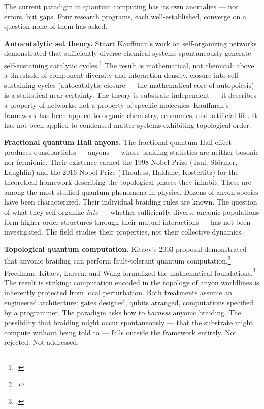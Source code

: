 The current paradigm in quantum computing has its own anomalies --- not errors, but gaps. Four research programs, each well-established, converge on a question none of them has asked.

\textbf{Autocatalytic set theory.} Stuart Kauffman's work on self-organizing networks demonstrated that sufficiently diverse chemical systems spontaneously generate self-sustaining catalytic cycles.\footcite{kauffman1993} The result is mathematical, not chemical: above a threshold of component diversity and interaction density, closure into self-sustaining cycles (autocatalytic closure --- the mathematical core of autopoiesis) is a statistical near-certainty. The theory is substrate-independent --- it describes a property of networks, not a property of specific molecules. Kauffman's framework has been applied to organic chemistry, economics, and artificial life. It has not been applied to condensed matter systems exhibiting topological order.

\textbf{Fractional quantum Hall anyons.} The fractional quantum Hall effect produces quasiparticles --- anyons --- whose braiding statistics are neither bosonic nor fermionic. Their existence earned the 1998 Nobel Prize (Tsui, St\"ormer, Laughlin) and the 2016 Nobel Prize (Thouless, Haldane, Kosterlitz) for the theoretical framework describing the topological phases they inhabit. These are among the most studied quantum phenomena in physics. Dozens of anyon species have been characterized. Their individual braiding rules are known. The question of what they self-organize \emph{into} --- whether sufficiently diverse anyonic populations form higher-order structures through their mutual interactions --- has not been investigated. The field studies their properties, not their collective dynamics.

\textbf{Topological quantum computation.} Kitaev's 2003 proposal demonstrated that anyonic braiding can perform fault-tolerant quantum computation.\footcite{kitaev2003} Freedman, Kitaev, Larsen, and Wang formalized the mathematical foundations.\footcite{freedman1998} The result is striking: computation encoded in the topology of anyon worldlines is inherently protected from local perturbation. Both treatments assume an engineered architecture: gates designed, qubits arranged, computations specified by a programmer. The paradigm asks how to \emph{harness} anyonic braiding. The possibility that braiding might occur spontaneously --- that the substrate might compute without being told to --- falls outside the framework entirely. Not rejected. Not addressed.

